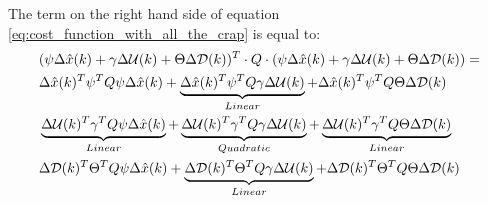 The term on the right hand side of equation \ref{eq:cost_function_with_all_the_crap} is equal to:
\begin{equation}\label{eq:cost_function_big_eq}
	\begin{aligned}
	&(\psi\Delta \hat{x}(k) + \gamma\Delta \CMcal{U}(k) + \Theta\Delta \CMcal{D}(k))^T\cdot Q \cdot (\psi\Delta \hat{x}(k) + \gamma\Delta \CMcal{U}(k) + \Theta\Delta \CMcal{D}(k)) = \\
	& \Delta \hat{x}(k)^T\psi ^T Q \psi \Delta \hat{x}(k) + \underbrace{\Delta \hat{x}(k)^T \psi ^T Q \gamma \Delta  \CMcal{U}(k) }_{Linear} +\Delta \hat{x}(k)^T \psi ^T Q \Theta \Delta \CMcal{D}(k) \\
	& \underbrace{\Delta \CMcal{U}(k)^T \gamma ^T Q \psi\Delta \hat{x}(k)}_{Linear} + \underbrace{\Delta \CMcal{U}(k)^T\gamma ^T Q \gamma\Delta \CMcal{U}(k)}_{Quadratic} +\underbrace{\Delta \CMcal{U}(k)^T \gamma ^T Q\Theta \Delta \CMcal{D}(k)}_{Linear} \\ 
	& \Delta \CMcal{D}(k)^T \Theta ^T Q  \psi \Delta \hat{x}(k)					+ \underbrace{\Delta \CMcal{D}(k)^T \Theta ^T Q \gamma  \Delta \CMcal{U}(k) }_{Linear}	+\Delta \CMcal{D}(k)^T \Theta ^T Q \Theta \Delta \CMcal{D}(k)
		\end{aligned}
\end{equation}

